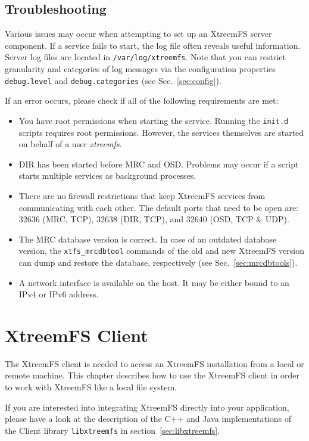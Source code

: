 \documentclass[a4paper,10pt]{book}
\begin{document}
\section{Troubleshooting}

Various issues may occur when attempting to set up an XtreemFS server component. If a service fails to start, the log file often reveals useful information. Server log files are located in \texttt{/var/log/xtreemfs}. Note that you can restrict granularity and categories of log messages via the configuration properties \texttt{debug.level} and \texttt{debug.categories} (see Sec.\ \ref{sec:config}).

If an error occurs, please check if all of the following requirements are met:
\begin{itemize}
 \item You have root permissions when starting the service. Running the \texttt{init.d} scripts requires root permissions. However, the services themselves are started on behalf of a user \textit{xtreemfs}.
 \item DIR has been started before MRC and OSD. Problems may occur if a script starts multiple services as background processes.
 \item There are no firewall restrictions that keep XtreemFS services from communicating with each other. The default ports that need to be open are: 32636 (MRC, TCP), 32638 (DIR, TCP), and 32640 (OSD, TCP \& UDP).
 \item The MRC database version is correct. In case of an outdated database version, the \texttt{xtfs\_mrcdbtool} commands of the old and new XtreemFS version can dump and restore the database, respectively (see Sec.\ \ref{sec:mrcdbtools}).
 \item A network interface is available on the host. It may be either bound to an IPv4 or IPv6 address.
\end{itemize}


\chapter{XtreemFS Client}

The XtreemFS client is needed to access an XtreemFS installation from a local or remote machine. This chapter describes how to use the XtreemFS client in order to work with XtreemFS like a local file system.

If you are interested into integrating XtreemFS directly into your application, please have a look at the description of the C++ and Java implementations of the Client library \texttt{libxtreemfs} in section~\ref{sec:libxtreemfs}.
\end{document}
